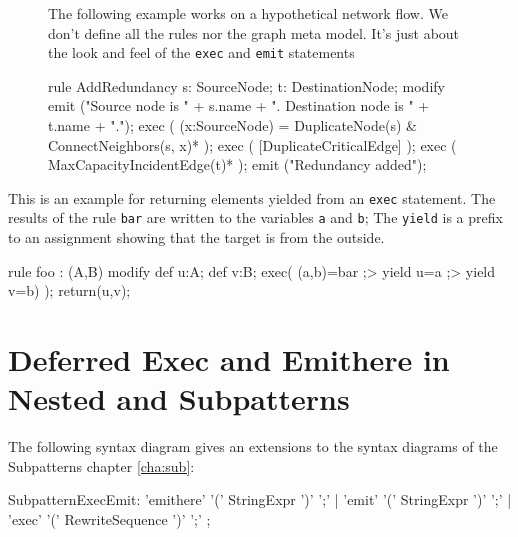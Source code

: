 \begin{figure}[htbp]
\begin{example}
	The following example works on a hypothetical network flow.
	We don't define all the rules nor the graph meta model.
	It's just about the look and feel of the \texttt{exec} and \texttt{emit} statements
	\begin{grgen}
rule AddRedundancy
{
  s: SourceNode;
  t: DestinationNode;
  modify {
    emit ("Source node is " + s.name + ". Destination node is " + t.name + ".");
    exec ( (x:SourceNode) = DuplicateNode(s) & ConnectNeighbors(s, x)* );
    exec ( [DuplicateCriticalEdge] );
    exec ( MaxCapacityIncidentEdge(t)* );
    emit ("Redundancy added");
  }
}
	\end{grgen}
\end{example}
\end{figure}

\begin{example}
This is an example for returning elements yielded from an \texttt{exec} statement.
The results of the rule \texttt{bar} are written to the variables \texttt{a} and \texttt{b};
The \texttt{yield} is a prefix to an assignment showing that the target is from the outside.

	\begin{grgen}
rule foo : (A,B)
{
  modify {
    def u:A; def v:B;
    exec( (a,b)=bar ;> yield u=a ;> yield v=b) );
    return(u,v);
  }
}
	\end{grgen}
\end{example}

\section{Deferred Exec and Emithere in Nested and Subpatterns}\label{sec:deferredexecemithere}

The following syntax diagram gives an extensions to the syntax diagrams of the Subpatterns chapter \ref{cha:sub}:
\begin{rail}
  SubpatternExecEmit:
		'emithere' '(' StringExpr ')' ';' |
		'emit' '(' StringExpr ')' ';' |
		'exec' '(' RewriteSequence ')' ';'
	;
\end{rail}

